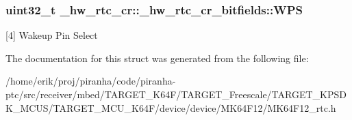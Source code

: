 \subsubsection[{\texorpdfstring{W\+PS}{WPS}}]{\setlength{\rightskip}{0pt plus 5cm}uint32\+\_\+t \+\_\+hw\+\_\+rtc\+\_\+cr\+::\+\_\+hw\+\_\+rtc\+\_\+cr\+\_\+bitfields\+::\+W\+PS}\hypertarget{struct__hw__rtc__cr_1_1__hw__rtc__cr__bitfields_a83df9924852ad443486c194fc49ef28f}{}\label{struct__hw__rtc__cr_1_1__hw__rtc__cr__bitfields_a83df9924852ad443486c194fc49ef28f}
\mbox{[}4\mbox{]} Wakeup Pin Select 

The documentation for this struct was generated from the following file\+:\begin{DoxyCompactItemize}
\item 
/home/erik/proj/piranha/code/piranha-\/ptc/src/receiver/mbed/\+T\+A\+R\+G\+E\+T\+\_\+\+K64\+F/\+T\+A\+R\+G\+E\+T\+\_\+\+Freescale/\+T\+A\+R\+G\+E\+T\+\_\+\+K\+P\+S\+D\+K\+\_\+\+M\+C\+U\+S/\+T\+A\+R\+G\+E\+T\+\_\+\+M\+C\+U\+\_\+\+K64\+F/device/device/\+M\+K64\+F12/M\+K64\+F12\+\_\+rtc.\+h\end{DoxyCompactItemize}
